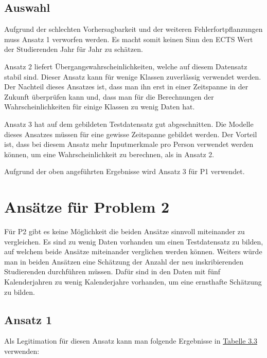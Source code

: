 \subsection{Auswahl}
Aufgrund der schlechten Vorhersagbarkeit und der weiteren Fehlerfortpflanzungen muss Ansatz 1 verworfen werden. Es macht somit keinen Sinn den ECTS Wert
der Studierenden Jahr f\"ur Jahr zu sch\"atzen.

Ansatz 2 liefert \"Ubergangswahrscheinlichkeiten, welche auf diesem Datensatz stabil sind. Dieser Ansatz kann f\"ur wenige Klassen zuverl\"assig verwendet werden.
Der Nachteil dieses Ansatzes ist, dass man ihn erst in einer Zeitspanne in der Zukunft \"uberpr\"ufen kann und, dass man f\"ur die Berechnungen der Wahrscheinlichkeiten
f\"ur einige Klassen zu wenig Daten hat.

Ansatz 3 hat auf dem gebildeten Testdatensatz gut abgeschnitten. Die Modelle dieses Ansatzes m\"ussen f\"ur eine gewisse Zeitspanne gebildet werden. Der Vorteil ist, dass
bei diesem Ansatz mehr Inputmerkmale pro Person verwendet werden k\"onnen, um eine Wahrscheinlichkeit zu berechnen, als in Ansatz 2.

Aufgrund der oben angef\"uhrten Ergebnisse wird Ansatz 3 f\"ur P1 verwendet.








\section{Ans\"atze f\"ur Problem 2}
F\"ur P2 gibt es keine M\"oglichkeit die beiden Ans\"atze sinnvoll miteinander zu vergleichen. Es sind zu wenig Daten vorhanden
um einen Testdatensatz zu bilden, auf welchem beide Ans\"atze miteinander verglichen werden k\"onnen. Weiters w\"urde man in beiden
Ans\"atzen eine Sch\"atzung der Anzahl der neu inskribierenden Studierenden durchf\"uhren m\"ussen. Daf\"ur sind in den Daten mit f\"unf Kalenderjahren
zu wenig Kalenderjahre vorhanden, um eine ernsthafte Sch\"atzung zu bilden.


\subsection{Ansatz 1}
Als Legitimation f\"ur diesen Ansatz kann man folgende Ergebnisse in \hyperref[tab:legitimationA1P2]{Tabelle 3.3} verwenden:

